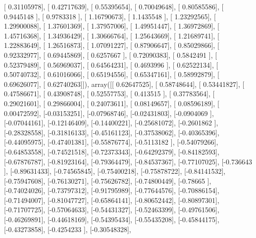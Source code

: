 \documentclass{article}
\begin{document}
       [ 0.31105978],
       [ 0.42717639],
       [ 0.55395654],
       [ 0.70049648],
       [ 0.80585586],
       [ 0.9445148 ],
       [ 0.9783318 ],
       [ 1.16790673],
       [ 1.1435548 ],
       [ 1.23292565],
       [ 1.29900088],
       [ 1.37601369],
       [ 1.37957006],
       [ 1.49951447],
       [ 1.36972869],
       [ 1.45716368],
       [ 1.34936429],
       [ 1.30666764],
       [ 1.25643669],
       [ 1.21689741],
       [ 1.22883649],
       [ 1.26516873],
       [ 1.07091227],
       [ 0.87906647],
       [ 0.85029866],
       [ 0.92332977],
       [ 0.69445869],
       [ 0.6257667 ],
       [ 0.72090383],
       [ 0.5842491 ],
       [ 0.52379489],
       [ 0.56969037],
       [ 0.64564231],
       [ 0.4693996 ],
       [ 0.62522134],
       [ 0.50740732],
       [ 0.61016066],
       [ 0.65194556],
       [ 0.65347161],
       [ 0.58992879],
       [ 0.69626077],
       [ 0.62740263]]), array([[ 0.62647525],
       [ 0.58748644],
       [ 0.53441827],
       [ 0.47586671],
       [ 0.43908748],
       [ 0.52557753],
       [ 0.413515  ],
       [ 0.37783564],
       [ 0.29021601],
       [ 0.29866004],
       [ 0.24073611],
       [ 0.08149657],
       [ 0.08596189],
       [ 0.00472592],
       [-0.03153251],
       [-0.07968746],
       [-0.02431803],
       [-0.0904069 ],
       [-0.07044161],
       [-0.12146409],
       [-0.14400221],
       [-0.25681072],
       [-0.2601862 ],
       [-0.28328558],
       [-0.31816133],
       [-0.45161123],
       [-0.37538062],
       [-0.40365396],
       [-0.44095975],
       [-0.47401381],
       [-0.55876774],
       [-0.5113182 ],
       [-0.54079266],
       [-0.64853558],
       [-0.74521518],
       [-0.72373343],
       [-0.64292379],
       [-0.84182593],
       [-0.67876787],
       [-0.81923164],
       [-0.79364479],
       [-0.84537367],
       [-0.77107025],
       [-0.736643  ],
       [-0.89631433],
       [-0.74565845],
       [-0.75400218],
       [-0.75878722],
       [-0.84141532],
       [-0.75947608],
       [-0.76130271],
       [-0.75626782],
       [-0.74800449],
       [-0.78665   ],
       [-0.74024026],
       [-0.73797312],
       [-0.91795989],
       [-0.77644576],
       [-0.70886154],
       [-0.71494007],
       [-0.81047727],
       [-0.65864141],
       [-0.80652442],
       [-0.80897301],
       [-0.71707725],
       [-0.57064633],
       [-0.54431327],
       [-0.52463399],
       [-0.49761506],
       [-0.46269891],
       [-0.44618169],
       [-0.54395434],
       [-0.55435208],
       [-0.45844175],
       [-0.43273858],
       [-0.4254233 ],
       [-0.30548328],
\end{document}
